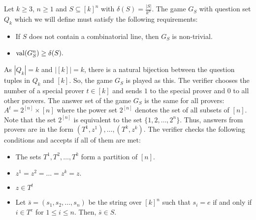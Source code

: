 Let $k \geq 3$, $n \geq 1$ and $S \subseteq [k]^n$ with $\delta (S)= \frac{|S|}{k^n}$. The game $G_S$ with question set $Q_k$ which we will define must satisfy the  following requirements: 
\begin{itemize}
\item If $S$ does not contain a combinatorial line, then $G_S$ is non-trivial. \item $\mathrm{val} (G_S^n) \geq \delta (S).$
\end{itemize}

As $|Q_k|=k$ and $|[k]|=k$, there is a natural bijection between the question tuples in $Q_k$ and $[k]$. So, the game $G_S$ is played as this. The verifier chooses the number of a special prover $t \in [k]$   and sends $1$ to the special prover and $0$ to all other provers. 
The answer set of the game $G_S$ is the same for all provers: $A^t=2^{[n]} \times [n]$ where the power set  $2^{[n]}$ denotes the set of all subsets of $[n]$. Note that the set $2^{[n]}$ is equivalent to the set $\{1,2,\ldots, 2^n\}.$ Thus, answers from provers are in the form $(T^1, z^1), \ldots, (T^k, z^k)$. The verifier checks the following conditions and accepts if all of them are met: 
\begin{itemize}
\item The sets $T^1, T^2,\ldots, T^k$ form a partition of $[n].$
\item $z^1=z^2=\ldots=z^k=z.$
\item $z \in T^t$
\item Let $\bar{s} = (s_1, s_2, \ldots, s_n)$ be the string over $[k]^n$ such that  $s_i = e$ if and only if $i \in  T ^e$ for $1\leq i \leq n.$ Then, $\bar{s} \in S.$
\end{itemize}

